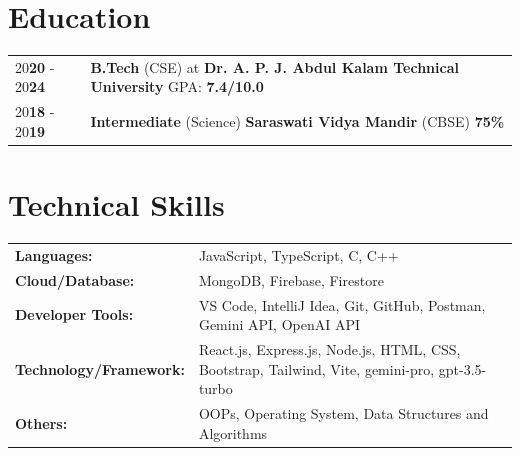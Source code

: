 \documentclass[a4paper,12pt]{article}
\begin{document}
\section{Education}
\begin{tabularx}{\linewidth}{@{}l X@{}}	
20\textbf{20} - 20\textbf{24} & \textbf{B.Tech} (CSE) at \textbf{Dr. A. P. J. Abdul Kalam Technical University} \hfill \normalsize GPA: \textbf{7.4/10.0} \\
20\textbf{18} - 20\textbf{19} & \textbf{Intermediate} (Science) \textbf{Saraswati Vidya Mandir} (CBSE) \hfill  \textbf{75\%} \\

\end{tabularx}

\section{Technical Skills}
\begin{tabularx}{\linewidth}{@{}l X@{}}
\textbf{Languages: } &  \normalsize{JavaScript, TypeScript, C, C++}\\
\textbf{Cloud/Database: }  &  \normalsize{MongoDB, Firebase, Firestore}\\
\textbf{Developer Tools: }  &  \normalsize{VS Code, IntelliJ Idea, Git, GitHub, Postman, Gemini API, OpenAI API}\\
\textbf{Technology/Framework: }  &  \normalsize{React.js, Express.js, Node.js, HTML, CSS, Bootstrap, Tailwind, Vite, gemini-pro, gpt-3.5-turbo}\\
\textbf{Others: }  &  \normalsize{OOPs, Operating System, Data Structures and Algorithms}\\
\end{tabularx}
\end{document}
